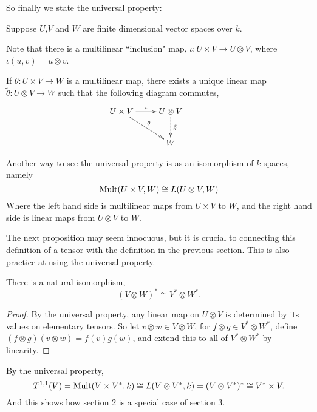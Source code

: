 \documentclass{owmaths}
\begin{document}
So finally we state the universal property:
\begin{theorem}
    Suppose $U$,$V$ and $W$ are finite dimensional vector spaces over $k$.
    
    Note that there is a multilinear ``inclusion" map, $\iota:U\times V\rightarrow U\otimes V$,
    where $\iota(u,v) = u\otimes v$.
    
    If $\theta:U\times V\rightarrow W$ is a multilinear map, there exists
    a unique linear map $\tilde{\theta}:U\otimes V\rightarrow W$ such that the following
    diagram commutes,
    \begin{displaymath}
    \xymatrix{
        {U\times V} \ar[r]^\iota \ar[rd]^\theta &
         {U\otimes V} \ar@{.>}[d]^{\tilde{\theta}}&\\
         &
         W
    }    
    \end{displaymath}
    
\end{theorem}
Another way to see the universal property is as an isomorphism of $k$ spaces,
namely
\begin{equation*}
    \operatorname{Mult}(U\times V,W) \cong L(U\otimes V,W)
\end{equation*}
Where the left hand side is multilinear maps from $U\times V$ to $W$, and
the right hand side is linear maps from $U\otimes V$ to $W$.

The next proposition may seem innocuous, but it is crucial to connecting
this definition of a tensor with the definition in the previous section.
This is also practice at using the universal property.
\begin{proposition}
    There is a natural isomorphism,
    \begin{equation*}
        (V\otimes W)^* \cong V^*\otimes W^*.
    \end{equation*}
\end{proposition}
\begin{proof}
    By the universal property, any linear map on $U\otimes V$
    is determined by its values on elementary tensors. So let $v\otimes w \in V\otimes W$,
    for $f\otimes g \in V^*\otimes W^*$, define $(f\otimes g)(v\otimes w) = f(v)g(w)$,
    and extend this to all of $V^*\otimes W^*$ by linearity. 
\end{proof}

By the universal property,
\begin{equation*}
    T^{1,1}(V) = \operatorname{Mult}(V\times V^*,k) \cong L(V\otimes V^*,k) = (V\otimes V^*)^* \cong V^*\times V. 
\end{equation*}
And this shows how section 2 is a special case of section 3.
\end{document}

